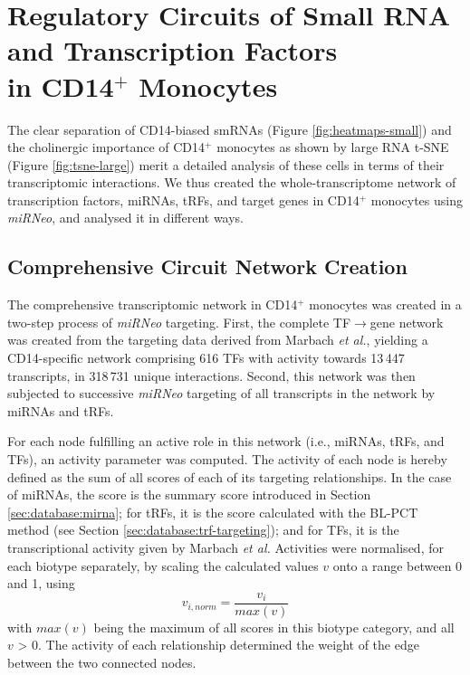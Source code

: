 \newpage

\section{Regulatory Circuits of Small RNA and Transcription Factors\\ in CD14$^+$ Monocytes}
The clear separation of CD14-biased smRNAs (Figure \ref{fig:heatmaps-small}) and the cholinergic importance of CD14$^+$ monocytes as shown by large RNA t-SNE (Figure \ref{fig:tsne-large}) merit a detailed analysis of these cells in terms of their transcriptomic interactions. We thus created the whole-transcriptome network of transcription factors, miRNAs, tRFs, and target genes in CD14$^+$ monocytes using \emph{miRNeo}, and analysed it in different ways.

\begin{method}

\subsection{Comprehensive Circuit Network Creation} \label{sec:stroke:circuit-network}
The comprehensive transcriptomic network in CD14$^+$ monocytes was created in a two-step process of \emph{miRNeo} targeting. First, the complete TF$\to$gene network was created from the targeting data derived from Marbach \emph{et al.}\cite{Marbach2016}, yielding a CD14-specific network comprising 616 TFs with activity towards 13\,447 transcripts, in 318\,731 unique interactions. Second, this network was then subjected to successive \emph{miRNeo} targeting of all transcripts in the network by miRNAs and tRFs.

For each node fulfilling an active role in this network (i.e., miRNAs, tRFs, and TFs), an activity parameter was computed. The activity of each node is hereby defined as the sum of all scores of each of its targeting relationships. In the case of miRNAs, the score is the summary score introduced in Section \ref{sec:database:mirna}; for tRFs, it is the score calculated with the BL-PCT method (see Section \ref{sec:database:trf-targeting}); and for TFs, it is the transcriptional activity given by Marbach \emph{et al.}\cite{Marbach2016} Activities were normalised, for each biotype separately, by scaling the calculated values $v$ onto a range between 0 and 1, using $$v_{i, norm} = \frac{v_i}{max(v)}$$
with $max(v)$ being the maximum of all scores in this biotype category, and all $v$ > 0. The activity of each relationship determined the weight of the edge between the two connected nodes.


\end{method}
